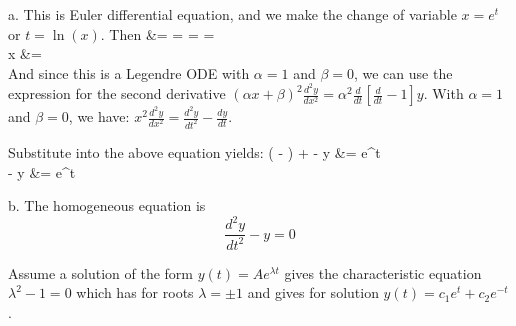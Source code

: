 \documentclass[12pt,twoside]{article}
\begin{document}
\be 
\item [a.]
This is Euler differential equation, and we make the change of variable $x=e^t$ or $t=\ln(x)$.
Then
\ba
	 &=   =   =    =     \\ 
	x   &=  \\
\ea
And since this is a Legendre ODE with $\alpha=1$ and $\beta=0$, we can use the expression for the second derivative 
$(\alpha x + \beta)^2 \frac{d^2y}{dx^2} = \alpha^2 \frac{d}{d t} [\frac{d}{dt} - 1] y$.
With $\alpha=1$ and $\beta=0$, we have: $ x^2 \frac{d^2y}{dx^2} =  \frac{d^2y}{dt^2} - \frac{dy}{dt}$. \\ \hfill \break

Substitute into the above equation yields:
\ba
	(  - ) +  - y &= e^t \\
	  - y &= e^t \\
\ea

\item [b.]
The homogeneous equation is
\[
	 \frac{d^2y}{dt^2} - y = 0
\]

Assume a solution of the form $y(t) = A e^{\lambda t}$ gives the characteristic equation $\lambda^2 - 1 = 0$ which has for roots $\lambda = \pm1$ and gives
for solution $y(t) = c_1 e^t + c_2 e^{-t}$.
\end{document}
